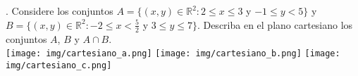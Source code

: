\section{}
. Considere los conjuntos $A = \{(x,y) \in \mathbb{R}^2 : 2 \leq x \leq 3$ y $-1 \leq y < 5\}$ y $B = \{(x,y) \in \mathbb{R}^2 : -2 \leq x < \frac{5}{2}$ y $3 \leq y \leq 7\}$. Describa en el plano cartesiano los conjuntos $A$, $B$ y $A \cap B$.\\

\noindent \texttt{[image: img/cartesiano\_a.png]} \indent  \texttt{[image: img/cartesiano\_b.png]}
\texttt{[image: img/cartesiano\_c.png]}